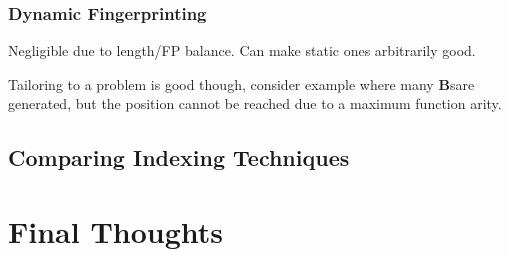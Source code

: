 \subsubsection{Dynamic Fingerprinting}
Negligible due to length/FP balance. Can make static ones arbitrarily good.

Tailoring to a problem is good though, consider example where many \textbf{B}sare generated,
 but the position cannot be reached due to a maximum function arity.

\subsection{Comparing Indexing Techniques}

\section{Final Thoughts}


